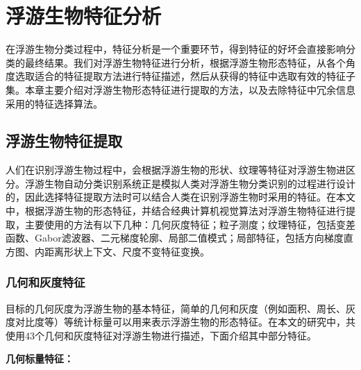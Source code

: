 \chapter{浮游生物特征分析}
\label{cha:phy}

在浮游生物分类过程中，特征分析是一个重要环节，得到特征的好坏会直接影响分类的最终结果。我们对浮游生物特征进行分析，根据浮游生物形态特征，从各个角度选取适合的特征提取方法进行特征描述，然后从获得的特征中选取有效的特征子集。本章主要介绍对浮游生物形态特征进行提取的方法，以及去除特征中冗余信息采用的特征选择算法。


\section{浮游生物特征提取}
\label{sec:FeatureExtraction}

人们在识别浮游生物过程中，会根据浮游生物的形状、纹理等特征对浮游生物进区分。浮游生物自动分类识别系统正是模拟人类对浮游生物分类识别的过程进行设计的，因此选择特征提取方法时可以结合人类在识别浮游生物时采用的特征。在本文中，根据浮游生物的形态特征，并结合经典计算机视觉算法对浮游生物特征进行提取，主要使用的方法有以下几种：几何灰度特征；粒子测度；纹理特征，包括变差函数、Gabor滤波器、二元梯度轮廓、局部二值模式；局部特征，包括方向梯度直方图、内距离形状上下文、尺度不变特征变换。

\subsection{几何和灰度特征}
\label{sec:graphs}

目标的几何灰度为浮游生物的基本特征，简单的几何和灰度（例如面积、周长、灰度对比度等）等统计标量可以用来表示浮游生物的形态特征。在本文的研究中，共使用43个几何和灰度特征对浮游生物进行描述，下面介绍其中部分特征。

\textbf{几何标量特征：}

